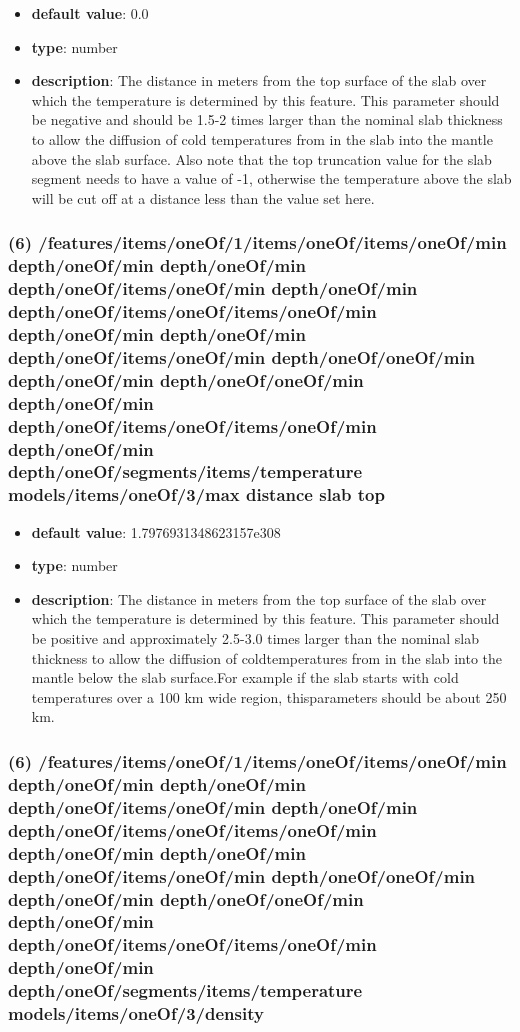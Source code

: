 \begin{itemize}[leftmargin=6em]\item {\bf default value}: 0.0
\item {\bf type}: number
\item {\bf description}: The distance in meters from the top surface of the slab over which the temperature is determined by this feature. This parameter should be negative and should be 1.5-2 times larger than the nominal slab thickness to allow the diffusion of cold temperatures from in the slab into the mantle above the slab surface. Also note that the top truncation value for the slab segment needs to have a value of -1, otherwise the temperature above the slab will be cut off at a distance less than the value set here.
\end{itemize}\subsubsection{(6) /features/items/oneOf/1/items/oneOf/items/oneOf/min depth/oneOf/min depth/oneOf/min depth/oneOf/items/oneOf/min depth/oneOf/min depth/oneOf/items/oneOf/items/oneOf/min depth/oneOf/min depth/oneOf/min depth/oneOf/items/oneOf/min depth/oneOf/oneOf/min depth/oneOf/min depth/oneOf/oneOf/min depth/oneOf/min depth/oneOf/items/oneOf/items/oneOf/min depth/oneOf/min depth/oneOf/segments/items/temperature models/items/oneOf/3/max distance slab top}
\begin{itemize}[leftmargin=6em]\item {\bf default value}: 1.7976931348623157e308
\item {\bf type}: number
\item {\bf description}: The distance in meters from the top surface of the slab over which the temperature is determined by this feature. This parameter should be positive and approximately 2.5-3.0 times larger than the nominal slab thickness to allow the diffusion of coldtemperatures from in the slab into the mantle below the slab surface.For example if the slab starts with cold temperatures over a 100 km wide region, thisparameters should be about 250 km.
\end{itemize}\subsubsection{(6) /features/items/oneOf/1/items/oneOf/items/oneOf/min depth/oneOf/min depth/oneOf/min depth/oneOf/items/oneOf/min depth/oneOf/min depth/oneOf/items/oneOf/items/oneOf/min depth/oneOf/min depth/oneOf/min depth/oneOf/items/oneOf/min depth/oneOf/oneOf/min depth/oneOf/min depth/oneOf/oneOf/min depth/oneOf/min depth/oneOf/items/oneOf/items/oneOf/min depth/oneOf/min depth/oneOf/segments/items/temperature models/items/oneOf/3/density}
